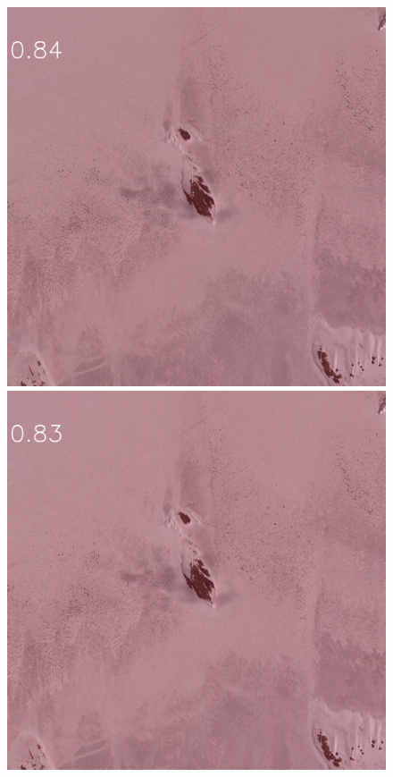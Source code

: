 \begin{figure}[h]
\includegraphics[width=\subFigx]{./fig/datagrow/MSE_single_unet_train_0_3.txt_bias-1_bs128_do0.1e25/WV02_20160101055824_103001004E1BFF00_16JAN01055824-M1BS-500637502050_01_P007_u08rf3031.png}
\includegraphics[width=\subFigx]{./fig/datagrow/MSE_single_unet_train_0_4.txt_bias-1_bs128_do0.1e25/WV02_20160101055824_103001004E1BFF00_16JAN01055824-M1BS-500637502050_01_P007_u08rf3031.png}


\end{figure}
